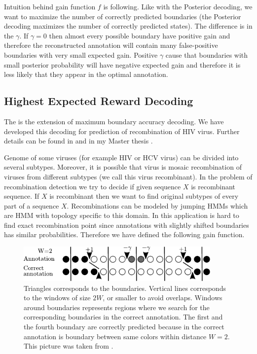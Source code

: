 Intuition behind gain function $f$ is following. Like with the Posterior
decoding, we want to maximize the number of correctly predicted boundaries (the
Posterior decoding maximizes the number of correctly predicted states). The
difference is in the $\gamma$. If $\gamma=0$ then almost every possible boundary
have positive gain and therefore the reconstructed annotation will contain many
false-positive boundaries with very small expected gain. Positive $\gamma$ cause
that boundaries with small posterior probability will have negative expected
gain and therefore it is less likely that they appear in the optimal annotation.


\subsection{Highest Expected Reward Decoding}\label{SECTION:HERD}

The  is the extension of maximum
boundary accuracy decoding. We have developed this decoding for prediction of
recombination of HIV virus.  Further details can be found in \cite{Nanasi2010}
and in my Master thesis \cite{Nanasi2010mgr}.


Genome of some viruses (for example HIV or HCV virus) can be divided into
several subtypes. Moreover, it is possible that virus is mosaic
recombination of viruses from different subtypes (we call this virus
recombinant). In the problem of recombination detection we try to decide if
given sequence $X$ is recombinant sequence. If $X$ is recombinant then we want to find
original subtypes of every part of a sequence $X$. Recombinations can be modeled
by jumping HMMs \cite{Schultz2006} which are HMM with topology specific to this domain.
In this application is 
hard to find exact recombination point since annotations with slightly shifted
boundaries has similar probabilities. Therefore we have defined the following gain
function.

\begin{figure}
\begin{center}
\includegraphics[width=10cm]{../figures/HERDbuddy.pdf}
\end{center}
\caption[Highest Expected Reward Decoding explanation]{
Triangles corresponds to the boundaries. Vertical lines corresponds to the windows
of size $2W$, or smaller to avoid overlaps. Windows around boundaries
represents regions where we search for the corresponding boundaries in the correct
annotation.
The first and the fourth boundary are correctly predicted because in the correct
annotation is boundary between same colors within distance $W=2$.
This picture was taken from \cite{Nanasi2010mgr}.
}\label{FIGURE:HERDBUDDY}
\end{figure}

